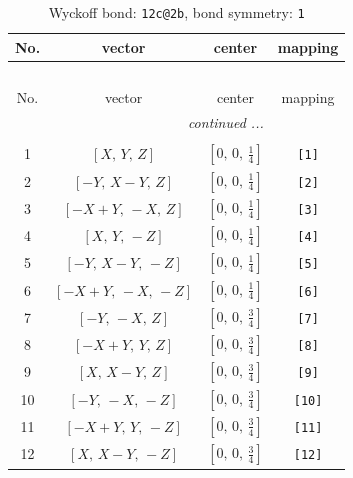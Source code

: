 \documentclass[fleqn,8pt]{jsarticle}
\begin{document}
\renewcommand{\arraystretch}{1.2}
\begin{longtable}{cccc}
\caption{Wyckoff bond: {\tt 12c@2b}, bond symmetry: {\tt 1}}
 \\
 \hline \hline
No. & vector & center & mapping \\ \hline \endfirsthead

\multicolumn{3}{l}{\tablename\ \thetable{}} \\
 \hline \hline
No. & vector & center & mapping \\ \hline \endhead

 \hline \hline
\multicolumn{3}{r}{\footnotesize\it continued ...} \\ \endfoot

 \hline \hline
\multicolumn{3}{r}{} \\ \endlastfoot

1 & $\left[ X,\, Y,\, Z \right]$ & $\left[ 0,\, 0,\, \frac{1}{4} \right]$ & {\tt [1]} \\ \hline
2 & $\left[ - Y,\, X - Y,\, Z \right]$ & $\left[ 0,\, 0,\, \frac{1}{4} \right]$ & {\tt [2]} \\ \hline
3 & $\left[ - X + Y,\, - X,\, Z \right]$ & $\left[ 0,\, 0,\, \frac{1}{4} \right]$ & {\tt [3]} \\ \hline
4 & $\left[ X,\, Y,\, - Z \right]$ & $\left[ 0,\, 0,\, \frac{1}{4} \right]$ & {\tt [4]} \\ \hline
5 & $\left[ - Y,\, X - Y,\, - Z \right]$ & $\left[ 0,\, 0,\, \frac{1}{4} \right]$ & {\tt [5]} \\ \hline
6 & $\left[ - X + Y,\, - X,\, - Z \right]$ & $\left[ 0,\, 0,\, \frac{1}{4} \right]$ & {\tt [6]} \\ \hline
7 & $\left[ - Y,\, - X,\, Z \right]$ & $\left[ 0,\, 0,\, \frac{3}{4} \right]$ & {\tt [7]} \\ \hline
8 & $\left[ - X + Y,\, Y,\, Z \right]$ & $\left[ 0,\, 0,\, \frac{3}{4} \right]$ & {\tt [8]} \\ \hline
9 & $\left[ X,\, X - Y,\, Z \right]$ & $\left[ 0,\, 0,\, \frac{3}{4} \right]$ & {\tt [9]} \\ \hline
10 & $\left[ - Y,\, - X,\, - Z \right]$ & $\left[ 0,\, 0,\, \frac{3}{4} \right]$ & {\tt [10]} \\ \hline
11 & $\left[ - X + Y,\, Y,\, - Z \right]$ & $\left[ 0,\, 0,\, \frac{3}{4} \right]$ & {\tt [11]} \\ \hline
12 & $\left[ X,\, X - Y,\, - Z \right]$ & $\left[ 0,\, 0,\, \frac{3}{4} \right]$ & {\tt [12]} \\
\end{longtable}
\end{document}
